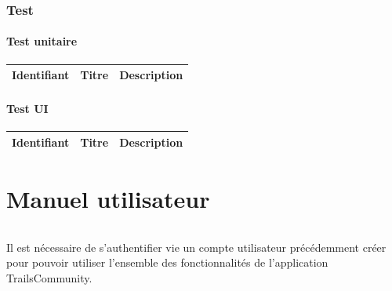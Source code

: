 \documentclass[titlepage, 12pt]{report}
\begin{document}
\section{Test}

\subsection{Test unitaire}

\begin{center}
	\begin{tabular}{|c|c|c|}
		\hline
		Identifiant & Titre & Description \\
		\hline \hline
	\end{tabular}
\end{center}

\subsection{Test UI}

\begin{center}
	\begin{tabular}{|c|c|c|}
		\hline
		Identifiant & Titre & Description \\
		\hline \hline
	\end{tabular}
\end{center}

\part{Manuel utilisateur}

\paragraph{}Il est nécessaire de s'authentifier vie un compte utilisateur précédemment créer pour pouvoir utiliser l'ensemble des fonctionnalités de l'application TrailsCommunity.
\end{document}
